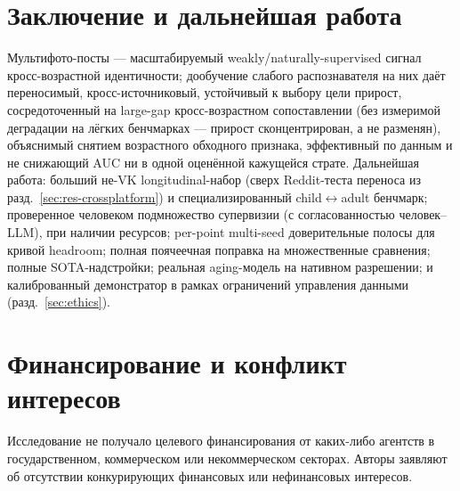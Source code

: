 \documentclass[journal]{IEEEtran}
\begin{document}
\section{Заключение и дальнейшая работа}\label{sec:conclusion}
Мультифото-посты --- масштабируемый weakly/naturally-supervised сигнал кросс-возрастной идентичности; дообучение слабого распознавателя на них даёт переносимый, кросс-источниковый, устойчивый к выбору цели прирост, сосредоточенный на large-gap кросс-возрастном сопоставлении (без измеримой деградации на лёгких бенчмарках --- прирост сконцентрирован, а не разменян), объяснимый снятием возрастного обходного признака, эффективный по данным и не снижающий AUC ни в одной оценённой кажущейся страте. Дальнейшая работа: больший не-VK longitudinal-набор (сверх Reddit-теста переноса из разд.~\ref{sec:res-crossplatform}) и специализированный child$\leftrightarrow$adult бенчмарк; проверенное человеком подмножество супервизии (с согласованностью человек--LLM), при наличии ресурсов; per-point multi-seed доверительные полосы для кривой headroom; полная поячеечная поправка на множественные сравнения; полные SOTA-надстройки; реальная aging-модель на нативном разрешении; и калиброванный демонстратор в рамках ограничений управления данными (разд.~\ref{sec:ethics}).

\section*{Финансирование и конфликт интересов}
Исследование не получало целевого финансирования от каких-либо агентств в государственном, коммерческом или некоммерческом секторах. Авторы заявляют об отсутствии конкурирующих финансовых или нефинансовых интересов.



\end{document}
